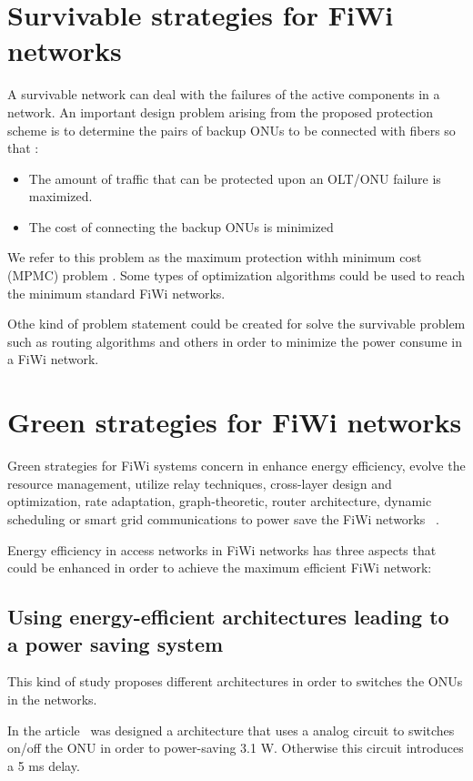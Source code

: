 \documentclass[conference,compsoc]{IEEEtran}
\begin{document}
\section{Survivable strategies for FiWi networks}%
A survivable network can deal with the failures of the active components in a network.
An important design problem arising from the proposed
protection scheme is to determine the pairs of backup ONUs
to be connected with fibers so that :
\begin{itemize}
\item The amount of traffic that can be protected upon an OLT/ONU failure is maximized.
             
\item The cost of connecting the backup ONUs is minimized
\end{itemize}

We refer to this problem as the maximum protection withh
minimum cost (MPMC) problem \cite{5759821}.
Some types of optimization algorithms could be used to reach the minimum
standard FiWi networks.

Othe kind of problem statement could be created for solve the survivable problem such as routing 
algorithms 
and others  in order to minimize the power consume in a FiWi network.



\section{Green strategies for FiWi networks}%
Green strategies for FiWi systems concern in enhance energy efficiency, 
evolve the resource management, utilize relay techniques, cross-layer design 
and optimization, rate adaptation, graph-theoretic, router architecture, 
dynamic scheduling or smart grid communications to power save the FiWi 
networks ~\cite{yu2012green}.

Energy efficiency in access networks in FiWi networks has three aspects that could be enhanced in 
order to achieve the maximum efficient FiWi network:


\subsection{Using energy-efficient architectures  leading to a power saving system}
This kind of study proposes different architectures in order to switches the ONUs in the networks.

In the article~\cite{sleepmode} was designed a architecture that uses a analog circuit to switches 
on/off the ONU in order to power-saving 3.1 W. Otherwise this circuit introduces a 5 ms delay.
\end{document}
